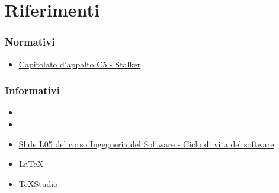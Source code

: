 \section{Riferimenti} 
\subsubsection{Normativi}
\begin{itemize}
	\item \href{https://www.math.unipd.it/~tullio/IS-1/2019/Progetto/C5.pdf}{Capitolato d'appalto C5 - Stalker}
\end{itemize}

\subsubsection{Informativi}
\begin{itemize}
	\item {}
	\item {}
	\item \href{https://www.math.unipd.it/~tullio/IS-1/2019/Dispense/L05.pdf}{Slide L05 del corso Ingegneria del Software - Ciclo di vita del software}
	\item \href{https://www.latex-project.org/help/documentation/}{\LaTeX}
	\item \href{https://www.texstudio.org/}{TeXStudio}
\end{itemize}
